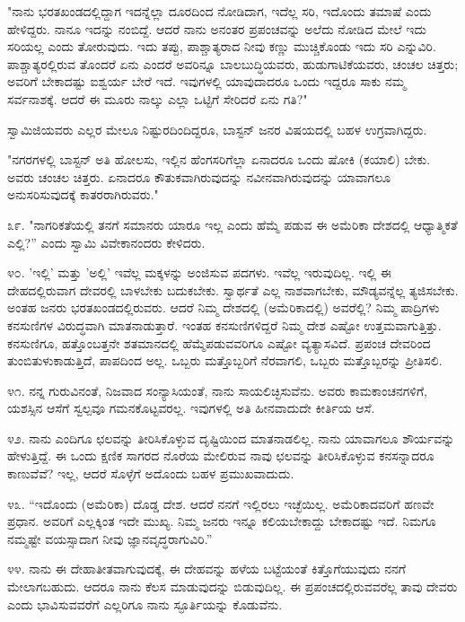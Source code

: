 "ನಾನು ಭರತಖಂಡದಲ್ಲಿದ್ದಾಗ ಇದನ್ನೆಲ್ಲಾ ದೂರದಿಂದ ನೋಡಿದಾಗ, ಇದೆಲ್ಲ ಸರಿ, ಇದೊಂದು ತಮಾಷೆ ಎಂದು ಹೇಳಿದ್ದರು. ನಾನೂ ಇದನ್ನು ನಂಬಿದ್ದೆ. ಆದರೆ ನಾನು ಅನಂತರ ಪ್ರಪಂಚವನ್ನು ಅಲೆದು ನೋಡಿದ ಮೇಲೆ ಇದು ಸರಿಯಲ್ಲ ಎಂದು ತೋರುವುದು. ಇದು ತಪ್ಪು, ಪಾಶ್ಚಾತ್ಯರಾದ ನೀವು ಕಣ್ಣು ಮುಚ್ಚಿಕೊಂಡು ಇದು ಸರಿ ಎನ್ನುವಿರಿ. ಪಾಶ್ಚಾತ್ಯರಲ್ಲಿರುವ ತೊಂದರೆ ಏನು ಎಂದರೆ ಅವರಿನ್ನೂ ಬಾಲಬುದ್ಧಿಯವರು, ಹುಡುಗಾಟಿಕೆಯವರು, ಚಂಚಲ ಚಿತ್ತರು; ಅವರಿಗೆ ಬೇಕಾದಷ್ಟು ಐಶ್ವರ್ಯ ಬೇರೆ ಇದೆ. ಇವುಗಳಲ್ಲಿ ಯಾವುದಾದರೂ ಒಂದು ಇದ್ದರೂ ಸಾಕು ನಮ್ಮ ಸರ್ವನಾಶಕ್ಕೆ. ಆದರೆ ಈ ಮೂರು ನಾಲ್ಕು ಎಲ್ಲಾ ಒಟ್ಟಿಗೆ ಸೇರಿದರೆ ಏನು ಗತಿ?"

ಸ್ವಾಮಿಜಿಯವರು ಎಲ್ಲರ ಮೇಲೂ ನಿಷ್ಟುರದಿಂದಿದ್ದರೂ, ಬಾಸ್ಟನ್ ಜನರ ವಿಷಯದಲ್ಲಿ ಬಹಳ ಉಗ್ರವಾಗಿದ್ದರು.

"ನಗರಗಳಲ್ಲಿ ಬಾಸ್ಟನ್ ಅತಿ ಹೋಲಸು, ಇಲ್ಲಿನ ಹೆಂಗಸರಿಗೆಲ್ಲಾ ಏನಾದರೂ ಒಂದು ಷೋಕಿ (ಕಯಾಲಿ) ಬೇಕು. ಅವರು ಚಂಚಲ ಚಿತ್ತರು. ಏನಾದರೂ ಕೌತುಕವಾಗಿರುವುದನ್ನು ನವೀನವಾಗಿರುವುದನ್ನು ಯಾವಾಗಲೂ ಅನುಸರಿಸುವುದಕ್ಕೆ ಕಾತರರಾಗಿರುವರು."

೩೯. "ನಾಗರಿಕತೆಯಲ್ಲಿ ತನಗೆ ಸಮಾನರು ಯಾರೂ ಇಲ್ಲ ಎಂದು ಹೆಮ್ಮೆ ಪಡುವ ಈ ಅಮೆರಿಕಾ ದೇಶದಲ್ಲಿ ಆಧ್ಯಾತ್ಮಿಕತೆ ಎಲ್ಲಿ?” ಎಂದು ಸ್ವಾಮಿ ವಿವೇಕಾನಂದರು ಕೇಳಿದರು.

೪೦. 'ಇಲ್ಲಿ' ಮತ್ತು 'ಅಲ್ಲಿ' ಇವೆಲ್ಲ ಮಕ್ಕಳನ್ನು ಅಂಜಿಸುವ ಪದಗಳು. ಇವೆಲ್ಲ ಇರುವುದಿಲ್ಲ. ಇಲ್ಲಿ ಈ ದೇಹದಲ್ಲಿರುವಾಗ ದೇವರಲ್ಲಿ ಬಾಳಬೇಕು ಬದುಕಬೇಕು. ಸ್ವಾರ್ಥತೆ ಎಲ್ಲ ನಾಶವಾಗಬೇಕು, ಮೌಡ್ಯವನ್ನೆಲ್ಲ ತ್ಯಜಿಸಬೇಕು. ಅಂತಹ ಜನರು ಭರತಖಂಡದಲ್ಲಿರುವರು. ಆದರೆ ನಿಮ್ಮ ದೇಶದಲ್ಲಿ (ಅಮೆರಿಕಾದಲ್ಲಿ) ಅವರೆಲ್ಲಿ? ನಿಮ್ಮ ಪಾದ್ರಿಗಳು ಕನಸುಣಿಗಳ ವಿರುದ್ಧವಾಗಿ ಮಾತನಾಡುತ್ತಾರೆ. ಇಂತಹ ಕನಸುಣಿಗಳಿದ್ದರೆ ನಿಮ್ಮ ದೇಶ ಎಷ್ಟೋ ಉತ್ತಮವಾಗುತ್ತಿತ್ತು. ಕನಸುಣಿಗೂ, ಹತ್ತೊಂಬತ್ತನೇ ಶತಮಾನದಲ್ಲಿ ಹೆಮ್ಮೆಪಡುವವರಿಗೂ ಎಷ್ಟೋ ವ್ಯತ್ಯಾಸವಿದೆ. ಪ್ರಪಂಚ ದೇವರಿಂದ ತುಂಬಿತುಳುಕಾಡುತ್ತಿದೆ, ಪಾಪದಿಂದ ಅಲ್ಲ. ಒಬ್ಬರು ಮತ್ತೊಬ್ಬರಿಗೆ ನೆರವಾಗಲಿ, ಒಬ್ಬರು ಮತ್ತೊಬ್ಬರನ್ನು ಪ್ರೀತಿಸಲಿ.

೪೧. ನನ್ನ ಗುರುವಿನಂತೆ, ನಿಜವಾದ ಸಂನ್ಯಾಸಿಯಂತೆ, ನಾನು ಸಾಯಲಿಚ್ಛಿಸುವೆನು. ಅವರು ಕಾಮಕಾಂಚನಗಳಿಗೆ, ಯಶಸ್ಸಿನ ಆಸೆಗೆ ಸ್ವಲ್ಪವೂ ಗಮನಕೊಟ್ಟವರಲ್ಲ. ಇವುಗಳಲ್ಲಿ ಅತಿ ಹೀನವಾದುದೇ ಕೀರ್ತಿಯ ಆಸೆ.

೪೨. ನಾನು ಎಂದಿಗೂ ಛಲವನ್ನು ತೀರಿಸಿಕೊಳ್ಳುವ ದೃಷ್ಟಿಯಿಂದ ಮಾತನಾಡಲಿಲ್ಲ. ನಾನು ಯಾವಾಗಲೂ ಶೌರ್ಯವನ್ನು ಹೇಳುತ್ತಿದ್ದೆ. ಈ ಒಂದು ಕ್ಷಣಿಕ ಸಾಗರದ ನೊರೆಯ ಮೇಲಿರುವ ನಾವು ಛಲವನ್ನು ತೀರಿಸಿಕೊಳ್ಳುವ ಕನಸನ್ನಾದರೂ ಕಾಣುವೆವೆ? ಇಲ್ಲ, ಆದರೆ ಸೊಳ್ಳೆಗೆ ಅದೊಂದು ಬಹಳ ಪ್ರಮುಖವಾದುದು.

೪೩. “ಇದೊಂದು (ಅಮೆರಿಕಾ) ದೊಡ್ಡ ದೇಶ. ಆದರೆ ನನಗೆ ಇಲ್ಲಿರಲು ಇಚ್ಛೆಯಿಲ್ಲ. ಅಮೆರಿಕಾದವರಿಗೆ ಹಣವೇ ಪ್ರಧಾನ. ಅವರಿಗೆ ಎಲ್ಲಕ್ಕಿಂತ ಇದೇ ಮುಖ್ಯ. ನಿಮ್ಮ ಜನರು ಇನ್ನೂ ಕಲಿಯಬೇಕಾದ್ದು ಬೇಕಾದಷ್ಟು ಇದೆ. ನಿಮಗೂ ನಮ್ಮಷ್ಟೇ ವಯಸ್ಸಾದಾಗ ನೀವು ಜ್ಞಾನವೃದ್ಧರಾಗುವಿರಿ.”

೪೪. ನಾನು ಈ ದೇಹಾತೀತವಾಗುವುದಕ್ಕೆ, ಈ ದೇಹವನ್ನು ಹಳೆಯ ಬಟ್ಟೆಯಂತೆ ಕಿತ್ತೊಗೆಯುವುದು ನನಗೆ ಮೇಲಾಗಬಹುದು. ಆದರೂ ನಾನು ಕೆಲಸ ಮಾಡುವುದನ್ನು ಬಿಡುವುದಿಲ್ಲ. ಈ ಪ್ರಪಂಚದಲ್ಲಿರುವವರೆಲ್ಲ ತಾವು ದೇವರು ಎಂದು ಭಾವಿಸುವವರೆಗೆ ಎಲ್ಲರಿಗೂ ನಾನು ಸ್ಫೂರ್ತಿಯನ್ನು ಕೊಡುವೆನು.

